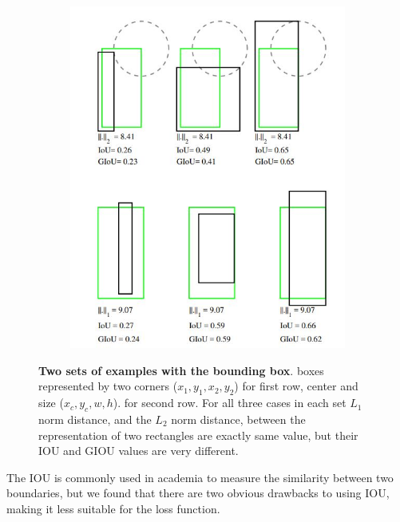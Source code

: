 \begin{figure}[h]
	\begin{center}
		\begin{subfigure}[b]{0.49\textwidth}
		    \centering
			\includegraphics[width=\textwidth]{thesis-template-master/images/l2loss.JPG}
			\label{fig:cellnet}
		\end{subfigure}
	\end{center}
	\caption{\textbf{Two sets of examples with the bounding box}.
boxes represented by two corners  ($x_{1}, y_{1}, x_{2}, y_{2}$)  for first row, center and size  ($x_{c}, y_{c}, w, h$). for second row. For all three cases in each set  $ L_{1}$ norm distance, and the $ L_{2}$ norm distance, between the representation of two rectangles are exactly same value, but their IOU and GIOU values are very different.}
    \label{fig:3.4}
\end{figure}

The IOU is commonly used in academia to measure the similarity between two boundaries, but we found that there are two obvious drawbacks to using IOU, making it less suitable for the loss function.

